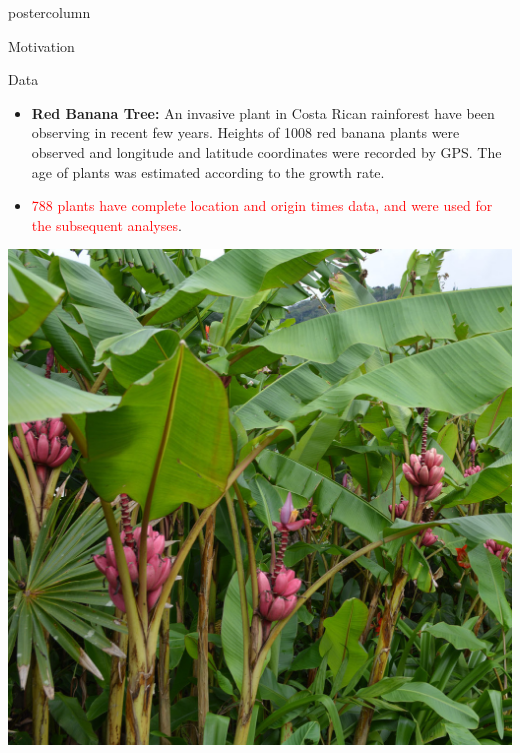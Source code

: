 \documentclass[final]{beamer}\usepackage[]{graphicx}\usepackage[]{color}
\newcommand{\red}{\textcolor{red}}
\begin{document}
{\begin{frame}
\begin{columns}
\begin{column}{.33\textwidth}
\begin{beamercolorbox}[center,wd=\textwidth]{postercolumn}
\begin{minipage}[T]{.97\textwidth}
{\begin{block}{Motivation}
	
\end{block}
\vfill


\begin{block}{Data}
	
\begin{itemize}
	\item \textbf{Red Banana Tree:} An invasive plant in Costa Rican rainforest have been observing in recent few years. Heights of 1008 red banana plants were observed and longitude and latitude coordinates were recorded by GPS. The age of plants was estimated according to the growth rate. 
  \vspace{0.4cm}
	\item \red{788 plants have complete location and origin times data, and were used for the subsequent analyses}.
\end{itemize}
  \vspace{0.4cm} \hspace{0.5cm}
  \includegraphics[scale=0.24]{redbanana3.jpg}
  \hspace{1cm}

\end{block}}
\end{minipage}
\end{beamercolorbox}
\end{column}
\end{columns}
\end{frame}}
\end{document}
